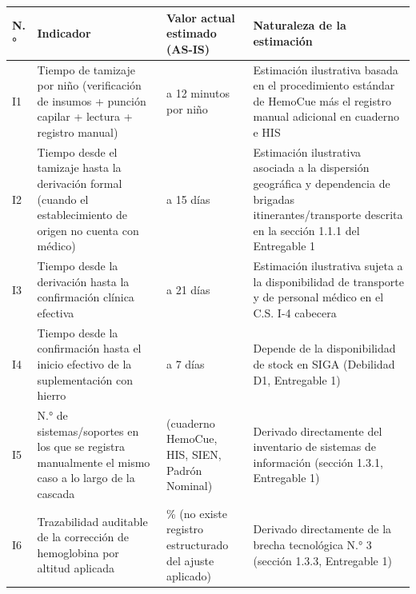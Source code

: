 \documentclass[11pt,a4paper]{article}
\begin{document}
{\small
\begin{longtable}[]{@{}
  >{\raggedright\arraybackslash}p{}
  >{\raggedright\arraybackslash}p{}
  >{\raggedright\arraybackslash}p{}
  >{\raggedright\arraybackslash}p{}@{}}
\toprule\noalign{}
\begin{minipage}[b]{\linewidth}\raggedright
N.°
\end{minipage} & \begin{minipage}[b]{\linewidth}\raggedright
Indicador
\end{minipage} & \begin{minipage}[b]{\linewidth}\raggedright
Valor actual estimado (AS-IS)
\end{minipage} & \begin{minipage}[b]{\linewidth}\raggedright
Naturaleza de la estimación
\end{minipage} \\
\midrule\noalign{}
\endhead
\bottomrule\noalign{}
\endlastfoot
I1 & Tiempo de tamizaje por niño (verificación de insumos + punción capilar + lectura + registro manual) & 8 a 12 minutos por niño & Estimación ilustrativa basada en el procedimiento estándar de HemoCue más el registro manual adicional en cuaderno e HIS \\
I2 & Tiempo desde el tamizaje hasta la derivación formal (cuando el establecimiento de origen no cuenta con médico) & 3 a 15 días & Estimación ilustrativa asociada a la dispersión geográfica y dependencia de brigadas itinerantes/transporte descrita en la sección 1.1.1 del Entregable 1 \\
I3 & Tiempo desde la derivación hasta la confirmación clínica efectiva & 7 a 21 días & Estimación ilustrativa sujeta a la disponibilidad de transporte y de personal médico en el C.S. I-4 cabecera \\
I4 & Tiempo desde la confirmación hasta el inicio efectivo de la suplementación con hierro & 0 a 7 días & Depende de la disponibilidad de stock en SIGA (Debilidad D1, Entregable 1) \\
I5 & N.° de sistemas/soportes en los que se registra manualmente el mismo caso a lo largo de la cascada & 4 (cuaderno HemoCue, HIS, SIEN, Padrón Nominal) & Derivado directamente del inventario de sistemas de información (sección 1.3.1, Entregable 1) \\
I6 & Trazabilidad auditable de la corrección de hemoglobina por altitud aplicada & 0 \% (no existe registro estructurado del ajuste aplicado) & Derivado directamente de la brecha tecnológica N.° 3 (sección 1.3.3, Entregable 1) \\

\end{longtable}}
\end{document}
